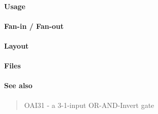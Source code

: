 \paragraph{Usage}

\paragraph{Fan-in / Fan-out}

\paragraph{Layout}

\paragraph{Files}

\paragraph{See also}
\begin{quote}
    OAI31 - a 3-1-input OR-AND-Invert gate
\end{quote}
